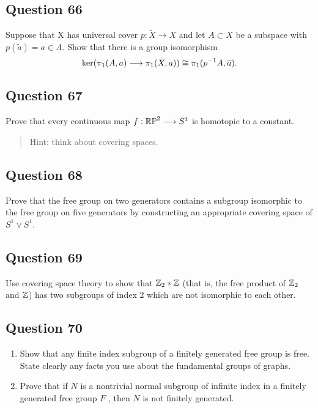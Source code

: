 \documentclass[12pt]{article}
\begin{document}
\hypertarget{question-66-3}{%
\subsection{Question 66}\label{question-66-3}}

Suppose that X has universal cover \(p : \tilde X \to X\) and let
\(A \subset X\) be a subspace with \(p(\tilde a) = a \in A\). Show that
there is a group isomorphism \[
\ker(\pi_1 (A, a) \longrightarrow \pi_1 (X, a)) \cong \pi_1 (p^{-1} A, \overline{a})
.\]

\hypertarget{question-67-3}{%
\subsection{Question 67}\label{question-67-3}}

Prove that every continuous map \(f : {\mathbb{RP}}^2 \longrightarrow S^1\) is homotopic to a
constant.

\begin{quote}
Hint: think about covering spaces.
\end{quote}

\hypertarget{question-68-3}{%
\subsection{Question 68}\label{question-68-3}}

Prove that the free group on two generators contains a subgroup
isomorphic to the free group on five generators by constructing an
appropriate covering space of \(S^1 \lor S^1\).

\hypertarget{question-69-3}{%
\subsection{Question 69}\label{question-69-3}}

Use covering space theory to show that \({\mathbb{Z}}_2 \ast {\mathbb{Z}}\) (that is, the
free product of \({\mathbb{Z}}_2\) and \({\mathbb{Z}}\)) has two subgroups of index 2
which are not isomorphic to each other.

\hypertarget{question-70-3}{%
\subsection{Question 70}\label{question-70-3}}

\begin{enumerate}
\def\labelenumi{\alph{enumi}.}
\item
  Show that any finite index subgroup of a finitely generated free group
  is free. State clearly any facts you use about the fundamental groups
  of graphs.
\item
  Prove that if \(N\) is a nontrivial normal subgroup of infinite index
  in a finitely generated free group \(F\) , then \(N\) is not finitely
  generated.
\end{enumerate}
\end{document}
